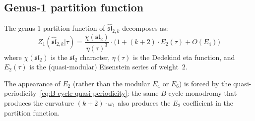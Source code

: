 \subsection{Genus-1 partition function}

\begin{proposition}
\label{prop:sl2-genus1-partition}
The genus-1 partition function of $\widehat{\mathfrak{sl}}_{2,k}$ decomposes as:
\begin{equation}\label{eq:sl2-genus1-partition}
Z_1(\widehat{\mathfrak{sl}}_{2,k}|\tau) = \frac{\chi(\mathfrak{sl}_2)}{\eta(\tau)^3} \cdot \bigl(1 + (k+2) \cdot E_2(\tau) + O(E_4)\bigr)
\end{equation}
where $\chi(\mathfrak{sl}_2)$ is the $\mathfrak{sl}_2$ character, $\eta(\tau)$ is the Dedekind eta function, and $E_2(\tau)$ is the (quasi-modular) Eisenstein series of weight~$2$.

The appearance of $E_2$ (rather than the modular $E_4$ or $E_6$) is forced by the quasi-periodicity~\eqref{eq:B-cycle-quasi-periodicity}: the same $B$-cycle monodromy that produces the curvature $(k+2) \cdot \omega_1$ also produces the $E_2$ coefficient in the partition function.
\end{proposition}

